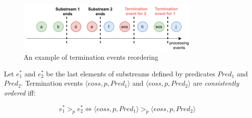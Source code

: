 \begin{figure}[t]
  \centering
  \includegraphics[width=0.80\textwidth]{Chapters/SubstreamConsistency/pics/notifications-reordering.pdf}
  \caption{An example of termination events reordering}
  \label{notifications_reordering}
\end{figure}

\begin{definition}
Let $e^{*}_1$ and $e^{*}_2$ be the last elements of substreams defined by predicates $Pred_1$ and $Pred_2$. Termination events $\langle eoss, p, Pred_1\rangle$ and $\langle eoss, p, Pred_2\rangle$ are {\em consistently ordered} iff:

\begin{equation}
e^{*}_1 >_p e^{*}_2 \Leftrightarrow \langle eoss, p, Pred_1\rangle >_p \langle eoss, p, Pred_2\rangle
\end{equation}
\end{definition}
